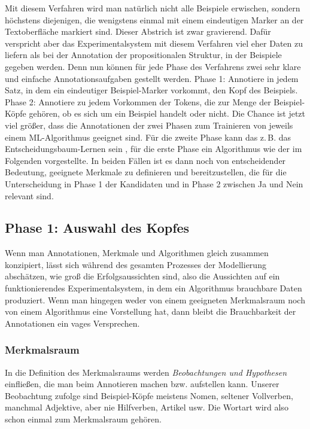 \documentclass{article}
\begin{document}
Mit diesem Verfahren wird man natürlich nicht alle Beispiele
erwischen, sondern höchstens diejenigen, die wenigstens einmal mit
einem eindeutigen Marker an der Textoberfläche markiert sind. Dieser
Abstrich ist zwar gravierend. Dafür verspricht aber das
Experimentalsystem mit diesem Verfahren viel eher Daten zu liefern als
bei der Annotation der propositionalen Struktur, in der Beispiele
gegeben werden. Denn nun können für jede Phase des Verfahrens zwei
sehr klare und einfache Annotationsaufgaben gestellt werden. Phase 1:
Annotiere in jedem Satz, in dem ein eindeutiger Beispiel-Marker
vorkommt, den Kopf des Beispiels. Phase 2: Annotiere zu jedem
Vorkommen der Tokens, die zur Menge der Beispiel-Köpfe gehören, ob es
sich um ein Beispiel handelt oder nicht. Die Chance ist jetzt viel
größer, dass die Annotationen der zwei Phasen zum Trainieren von
jeweils einem ML-Algorithmus geeignet sind. Für die zweite Phase kann
das z.\,B. das Entscheidungsbaum-Lernen
sein \parencite[105--120]{Beierle2014a}, für die erste Phase ein
Algorithmus wie der im Folgenden vorgestellte. In beiden Fällen ist es
dann noch von entscheidender Bedeutung, geeignete Merkmale zu
definieren und bereitzustellen, die für die Unterscheidung in Phase 1
der Kandidaten und in Phase 2 zwischen Ja und Nein relevant sind.

\subsection{Phase 1: Auswahl des Kopfes}

Wenn man Annotationen, Merkmale und Algorithmen gleich zusammen
konzipiert, lässt sich während des gesamten Prozesses der Modellierung
abschätzen, wie groß die Erfolgsaussichten sind, also die Aussichten
auf ein funktionierendes Experimentalsystem, in dem ein Algorithmus
brauchbare Daten produziert. Wenn man hingegen weder von einem
geeigneten Merkmalsraum noch von einem Algorithmus eine Vorstellung
hat, dann bleibt die Brauchbarkeit der Annotationen ein vages
Versprechen.

\subsubsection{Merkmalsraum}

In die Definition des Merkmalsraums werden \emph{Beobachtungen und
  Hypothesen} einfließen, die man beim Annotieren machen
bzw. aufstellen kann. Unserer Beobachtung zufolge sind Beispiel-Köpfe
meistens Nomen, seltener Vollverben, manchmal Adjektive, aber nie
Hilfverben, Artikel usw. Die Wortart wird also schon einmal zum
Merkmalsraum gehören.
\end{document}
